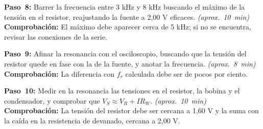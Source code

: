 \documentclass[12pt]{article}
\begin{document}
\begin{pasos}
  \item \textbf{Paso~8:} Barrer la frecuencia entre 3 kHz y 8 kHz buscando el máximo de la tensión en el resistor, reajustando la fuente a 2,00 V eficaces. \emph{(aprox.~\SI{10}{\minute})} \textbf{Comprobación:} El máximo debe aparecer cerca de 5 kHz; si no se encuentra, revisar las conexiones de la serie.
  \item \textbf{Paso~9:} Afinar la resonancia con el osciloscopio, buscando que la tensión del resistor quede en fase con la de la fuente, y anotar la frecuencia. \emph{(aprox.~\SI{8}{\minute})} \textbf{Comprobación:} La diferencia con $f_r$ calculada debe ser de pocos por ciento.
  \item \textbf{Paso~10:} Medir en la resonancia las tensiones en el resistor, la bobina y el condensador, y comprobar que $V_S \approx V_R + I R_W$. \emph{(aprox.~\SI{10}{\minute})} \textbf{Comprobación:} La tensión del resistor debe ser cercana a 1,60 V y la suma con la caída en la resistencia de devanado, cercana a 2,00 V.
\end{pasos}
\end{document}
